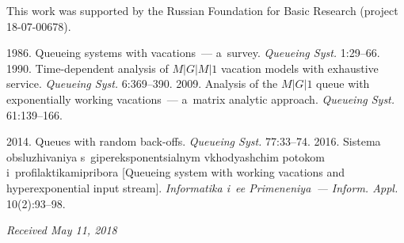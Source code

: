 



\vspace*{-14pt}

\Ack
\noindent
This work was supported by the Russian Foundation for Basic Research 
(project 18-07-00678).



  \begin{multicols}{2}

\renewcommand{\bibname}{\protect\rmfamily References}

{\small\frenchspacing
 {%
 \begin{thebibliography}{9}
 1986. Queueing systems with vacations~--- a~survey. 
\textit{Queueing Syst.} 1:29--66.
 1990. Time-dependent analysis of $M\vert G\vert M\vert 1$ 
vacation models with exhaustive service. \textit{Queueing Syst.} 6:369--390.
 2009. Analysis of the 
$M\vert G\vert 1$ queue with exponentially working vacations~--- 
a~matrix analytic approach. \textit{Queueing Syst.} 61:139--166.
{

}
2014. Queues with random back-offs. \textit{Queueing Syst.} 77:33--74.
 2016. Sistema obsluzhivaniya s~gipereksponentsialnym 
vkhodyashchim potokom i~profilaktikami\linebreak pribora [Queueing system with working 
vacations and hyperexponential input stream]. 
\textit{Informatika i~ee Primeneniya~--- Inform. Appl.} 10(2):93--98.
\end{thebibliography}

 }
 }

\end{multicols}

\vspace*{-6pt}

\hfill{\small\textit{Received May 11, 2018}}



